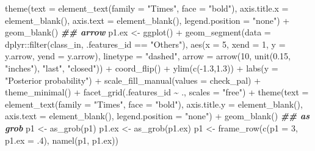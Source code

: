 \documentclass[
]{article}
\newenvironment{Shaded}{\begin{snugshade}}{\end{snugshade}}
\newcommand{\AttributeTok}[1]{\textcolor[rgb]{0.77,0.63,0.00}{#1}}
\newcommand{\DecValTok}[1]{\textcolor[rgb]{0.00,0.00,0.81}{#1}}
\newcommand{\DocumentationTok}[1]{\textcolor[rgb]{0.56,0.35,0.01}{\textbf{\textit{#1}}}}
\newcommand{\FloatTok}[1]{\textcolor[rgb]{0.00,0.00,0.81}{#1}}
\newcommand{\FunctionTok}[1]{\textcolor[rgb]{0.00,0.00,0.00}{#1}}
\newcommand{\NormalTok}[1]{#1}
\newcommand{\OtherTok}[1]{\textcolor[rgb]{0.56,0.35,0.01}{#1}}
\newcommand{\SpecialCharTok}[1]{\textcolor[rgb]{0.00,0.00,0.00}{#1}}
\newcommand{\StringTok}[1]{\textcolor[rgb]{0.31,0.60,0.02}{#1}}
\begin{document}
\begin{Shaded}
\begin{Highlighting}[]
  \FunctionTok{theme}\NormalTok{(}\AttributeTok{text =} \FunctionTok{element\_text}\NormalTok{(}\AttributeTok{family =} \StringTok{"Times"}\NormalTok{, }\AttributeTok{face =} \StringTok{"bold"}\NormalTok{),}
    \AttributeTok{axis.title.x =} \FunctionTok{element\_blank}\NormalTok{(),}
    \AttributeTok{axis.text =} \FunctionTok{element\_blank}\NormalTok{(),}
    \AttributeTok{legend.position =} \StringTok{"none"}\NormalTok{) }\SpecialCharTok{+}
  \FunctionTok{geom\_blank}\NormalTok{()}
\DocumentationTok{\#\# arrow}
\NormalTok{p1.ex }\OtherTok{\textless{}{-}} \FunctionTok{ggplot}\NormalTok{() }\SpecialCharTok{+}
  \FunctionTok{geom\_segment}\NormalTok{(}\AttributeTok{data =}\NormalTok{ dplyr}\SpecialCharTok{::}\FunctionTok{filter}\NormalTok{(class\_in, .features\_id }\SpecialCharTok{==} \StringTok{"Others"}\NormalTok{),}
    \FunctionTok{aes}\NormalTok{(}\AttributeTok{x =} \DecValTok{5}\NormalTok{, }\AttributeTok{xend =} \DecValTok{1}\NormalTok{, }\AttributeTok{y =}\NormalTok{ y.arrow, }\AttributeTok{yend =}\NormalTok{ y.arrow),}
    \AttributeTok{linetype =} \StringTok{"dashed"}\NormalTok{,}
    \AttributeTok{arrow =} \FunctionTok{arrow}\NormalTok{(}\DecValTok{10}\NormalTok{, }\FunctionTok{unit}\NormalTok{(}\FloatTok{0.15}\NormalTok{, }\StringTok{"inches"}\NormalTok{), }\StringTok{"last"}\NormalTok{, }\StringTok{"closed"}\NormalTok{)) }\SpecialCharTok{+}
  \FunctionTok{coord\_flip}\NormalTok{() }\SpecialCharTok{+}
  \FunctionTok{ylim}\NormalTok{(}\FunctionTok{c}\NormalTok{(}\SpecialCharTok{{-}}\FloatTok{1.3}\NormalTok{,}\FloatTok{1.3}\NormalTok{)) }\SpecialCharTok{+}
  \FunctionTok{labs}\NormalTok{(}\AttributeTok{y =} \StringTok{"Posterior probability"}\NormalTok{) }\SpecialCharTok{+}
  \FunctionTok{scale\_fill\_manual}\NormalTok{(}\AttributeTok{values =}\NormalTok{ check\_pal) }\SpecialCharTok{+}
  \FunctionTok{theme\_minimal}\NormalTok{() }\SpecialCharTok{+}
  \FunctionTok{facet\_grid}\NormalTok{(.features\_id }\SpecialCharTok{\textasciitilde{}}\NormalTok{ ., }\AttributeTok{scales =} \StringTok{"free"}\NormalTok{) }\SpecialCharTok{+}
  \FunctionTok{theme}\NormalTok{(}\AttributeTok{text =} \FunctionTok{element\_text}\NormalTok{(}\AttributeTok{family =} \StringTok{"Times"}\NormalTok{, }\AttributeTok{face =} \StringTok{"bold"}\NormalTok{),}
    \AttributeTok{axis.title.y =} \FunctionTok{element\_blank}\NormalTok{(),}
    \AttributeTok{axis.text =} \FunctionTok{element\_blank}\NormalTok{(),}
    \AttributeTok{legend.position =} \StringTok{"none"}\NormalTok{) }\SpecialCharTok{+}
  \FunctionTok{geom\_blank}\NormalTok{()}
\DocumentationTok{\#\# as grob}
\NormalTok{p1 }\OtherTok{\textless{}{-}} \FunctionTok{as\_grob}\NormalTok{(p1)}
\NormalTok{p1.ex }\OtherTok{\textless{}{-}} \FunctionTok{as\_grob}\NormalTok{(p1.ex)}
\NormalTok{p1 }\OtherTok{\textless{}{-}} \FunctionTok{frame\_row}\NormalTok{(}\FunctionTok{c}\NormalTok{(}\AttributeTok{p1 =} \DecValTok{3}\NormalTok{, }\AttributeTok{p1.ex =}\NormalTok{ .}\DecValTok{4}\NormalTok{), }\FunctionTok{namel}\NormalTok{(p1, p1.ex))}


\end{Highlighting}
\end{Shaded}
\end{document}
